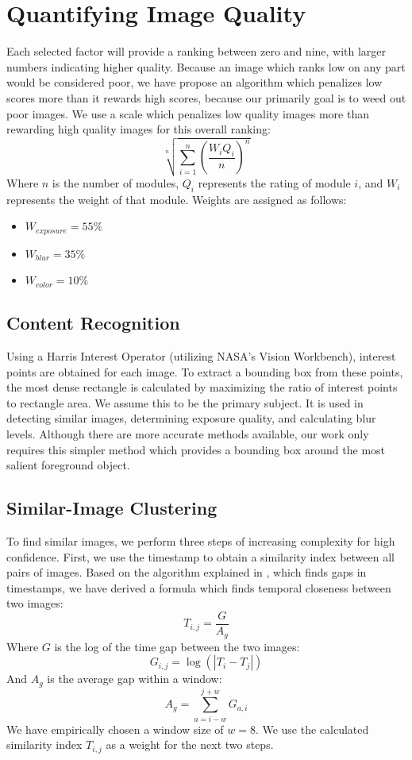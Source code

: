 \documentclass[twocolumn]{article}
\begin{document}
\section{Quantifying Image Quality}
Each selected factor will provide a ranking between zero and nine, with larger numbers indicating higher quality. Because an image which ranks low on any part would be considered poor, we have propose an algorithm which penalizes low scores more than it rewards high scores, because our primarily goal is to weed out poor images. We use a scale which penalizes low quality images more than rewarding high quality images for this overall ranking:
\[
\sqrt[n]{\displaystyle\sum\limits_{i=1}^n(\frac{W_iQ_i}{n})^n}
\]
Where \(n\) is the number of modules, \(Q_i\) represents the rating of module \(i\), and \(W_i\) represents the weight of that module. Weights are assigned as follows:
\begin{itemize}
\item \(W_{exposure}=55\%\)
\item \(W_{blur}=35\%\)
\item \(W_{color}=10\%\)
\end{itemize}

\subsection{Content Recognition}
Using a Harris Interest Operator (utilizing NASA's Vision Workbench\cite{vision-workbench}), interest points are obtained for each image. To extract a bounding box from these points, the most dense rectangle is calculated by maximizing the ratio of interest points to rectangle area. We assume this to be the primary subject. It is used in detecting similar images, determining exposure quality, and calculating blur levels. Although there are more accurate methods available\cite{5649226}, our work only requires this simpler method which provides a bounding box around the most salient foreground object.

\subsection{Similar-Image Clustering}
To find similar images, we perform three steps of increasing complexity for high confidence.
First, we use the timestamp to obtain a similarity index between all pairs of images. Based on the algorithm explained in \cite{1292402}, which finds gaps in timestamps, we have derived a formula which finds temporal closeness between two images:
\[
T_{i,j}=\frac{G}{A_g}
\]
Where \(G\) is the log of the time gap between the two images:
\[
G_{i,j}=\log(|T_i-T_j|)
\]
And \(A_g\) is the average gap within a window:
\[
A_g=\displaystyle\sum\limits_{a={i-w}}^{j+w}G_{a,i}
\]
We have empirically chosen a window size of \(w=8\).
We use the calculated similarity index \(T_{i,j}\) as a weight for the next two steps.
\end{document}
